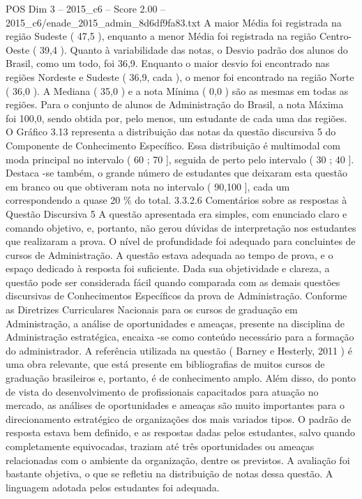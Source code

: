 \begin{textsample}{POS Dim 3 – 2015\_c6 – Score 2.00 – 2015\_c6/enade\_2015\_admin\_8d6df9fa83.txt}
A maior Média foi registrada na região Sudeste ( 47,5 ), enquanto a menor Média foi registrada na região Centro-Oeste ( 39,4 ).
Quanto à variabilidade das notas, o Desvio padrão dos alunos do Brasil, como um todo, foi 36,9.
Enquanto o maior desvio foi encontrado nas regiões Nordeste e Sudeste ( 36,9, cada ), o menor foi encontrado na região Norte ( 36,0 ).
A Mediana ( 35,0 ) e a nota Mínima ( 0,0 ) são as mesmas em todas as regiões.
Para o conjunto de alunos de Administração do Brasil, a nota Máxima foi 100,0, sendo obtida por, pelo menos, um estudante de cada uma das regiões.
O Gráfico 3.13 representa a distribuição das notas da questão discursiva 5 do Componente de Conhecimento Específico.
Essa distribuição é multimodal com moda principal no intervalo ( 60 ; 70 ], seguida de perto pelo intervalo ( 30 ; 40 ].
Destaca -se também, o grande número de estudantes que deixaram esta questão em branco ou que obtiveram nota no intervalo ( 90,100 ], cada um correspondendo a quase 20 \% do total. 3.3.2.6 Comentários sobre as respostas à Questão Discursiva 5 A questão apresentada era simples, com enunciado claro e comando objetivo, e, portanto, não gerou dúvidas de interpretação nos estudantes que realizaram a prova.
O nível de profundidade foi adequado para concluintes de cursos de Administração.
A questão estava adequada ao tempo de prova, e o espaço dedicado à resposta foi suficiente.
Dada sua objetividade e clareza, a questão pode ser considerada fácil quando comparada com as demais questões discursivas de Conhecimentos Específicos da prova de Administração.
Conforme as Diretrizes Curriculares Nacionais para os cursos de graduação em Administração, a análise de oportunidades e ameaças, presente na disciplina de Administração estratégica, encaixa -se como conteúdo necessário para a formação do administrador.
A referência utilizada na questão ( Barney e Hesterly, 2011 ) é uma obra relevante, que está presente em bibliografias de muitos cursos de graduação brasileiros e, portanto, é de conhecimento amplo.
Além disso, do ponto de vista do desenvolvimento de profissionais capacitados para atuação no mercado, as análises de oportunidades e ameaças são muito importantes para o direcionamento estratégico de organizações dos mais variados tipos.
O padrão de resposta estava bem definido, e as respostas dadas pelos estudantes, salvo quando completamente equivocadas, traziam até três oportunidades ou ameaças relacionadas com o ambiente da organização, dentre os previstos.
A avaliação foi bastante objetiva, o que se refletiu na distribuição de notas dessa questão.
A linguagem adotada pelos estudantes foi adequada.

\end{textsample}
